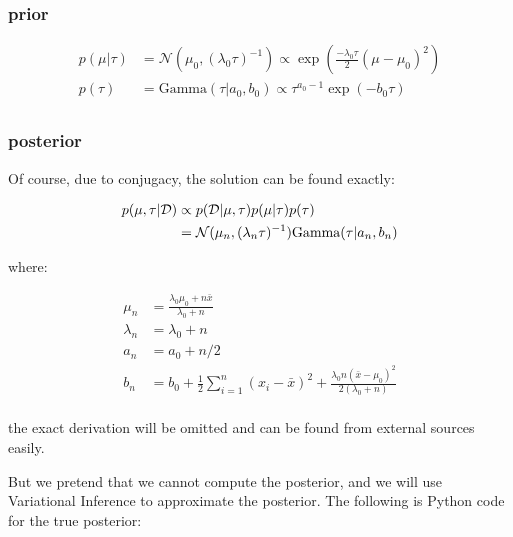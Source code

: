 \documentclass{article}
\begin{document}
\subsubsection{prior}

\begin{equation}\begin{split}
p ( \mu | \tau ) &= \mathcal{N} (\mu_0,  (\lambda_0 \tau)^{-1}) \propto \exp \left( \frac{-\lambda_0 \tau}{2} (\mu - \mu_0)^2 \right) \\
p(\tau) &=  \text{Gamma}( \tau | a_0, b_0) \propto \tau^{a_0-1}\exp(-b_0 \tau) \\
\end{split}\end{equation}

\subsubsection{posterior}


Of course, due to conjugacy, the solution can be found exactly:

\begin{equation}\begin{split}
p (  \mu,  \tau | \mathcal{D}) &\propto p ( \mathcal{D}| \mu, \tau )  p (\mu | \tau) p(\tau)\\ 
&=  \mathcal{N}(\mu_n,  (\lambda_n \tau)^{-1})\text{Gamma}( \tau | a_n, b_n) \\
\end{split}\end{equation}

where:

\begin{equation}\begin{split}
\mu_n & =\frac{\lambda_0 \mu_0 + n \bar{x}}{\lambda_0 + n}\\
\lambda_n &= \lambda_0 + n\\
a_n &= a_0 + n/2 \\
b_n &= b_0 + \frac{1}{2} \sum_{i=1}^n (x_i - \bar{x})^2 +  \frac{\lambda_0 n (\bar{x} - \mu_0)^2}{2(\lambda_0 + n)}\\
\end{split}\end{equation}

the exact derivation will be omitted and can be found from external sources easily.

But we pretend that we cannot compute the posterior, and we will use Variational Inference to approximate the posterior. The following is Python code for the true posterior:
\end{document}

